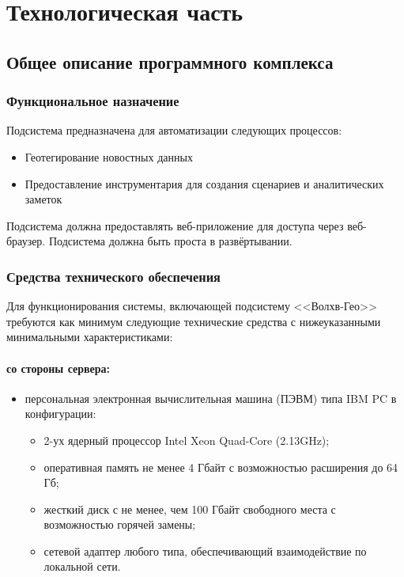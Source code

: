\section{Технологическая часть}

\subsection{Общее описание программного комплекса}
\subsubsection{Функциональное назначение}

Подсистема предназначена для автоматизации следующих процессов:
\begin{itemize}
\item Геотегирование новостных данных
\item Предоставление инструментария для создания сценариев и аналитических заметок
\end{itemize}

Подсистема должна предоставлять веб-приложение для доступа через веб-браузер.
Подсистема должна быть проста в развёртывании.

\subsubsection{Средства технического обеспечения}

Для функционирования системы, включающей подсистему <<Волхв-Гео>> требуются как минимум следующие технические средства с нижеуказанными минимальными характеристиками:
\paragraph*{со стороны сервера:} \hfill


\begin{itemize}
\item персональная электронная вычислительная машина (ПЭВМ) типа IBM PC в
конфигурации:

\begin{itemize}
\item 2-ух ядерный процессор Intel Xeon Quad-Core (2.13GHz);
\item оперативная память не менее 4 Гбайт с возможностью расширения до 64 Гб;
\item жесткий диск с не менее, чем 100 Гбайт свободного места с возможностью горячей замены;
\item сетевой адаптер любого типа, обеспечивающий взаимодействие по локальной сети.
\end{itemize}
\end{itemize}

